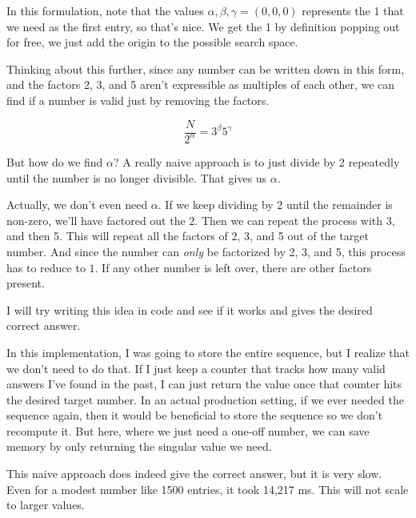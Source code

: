 \documentclass{article}
\begin{document}
In this formulation, note that the values $\alpha, \beta, \gamma = (0,0,0)$ represents the 1 that we need as the first entry, so that's nice. We get the 1 by definition popping out for free, we just add the origin to the possible search space. \newline

Thinking about this further, since any number can be written down in this form, and the factors 2, 3, and 5 aren't expressible as multiples of each other, we can find if a number is valid just by removing the factors.

\begin{equation}
    \frac{N}{2^{\alpha}} = 3^{\beta} 5^{\gamma}
\end{equation}

But how do we find $\alpha$? A really naive approach is to just divide by 2 repeatedly until the number is no longer divisible. That gives us $\alpha$. \newline

Actually, we don't even need $\alpha$. If we keep dividing by 2 until the remainder is non-zero, we'll have factored out the 2. Then we can repeat the process with 3, and then 5. This will repeat all the factors of 2, 3, and 5 out of the target number. And since the number can \textit{only} be factorized by 2, 3, and 5, this process has to reduce to $1$. If any other number is left over, there are other factors present. \newline

I will try writing this idea in code and see if it works and gives the desired correct answer. \newline

In this implementation, I was going to store the entire sequence, but I realize that we don't need to do that. If I just keep a counter that tracks how many valid answers I've found in the past, I can just return the value once that counter hits the desired target number. In an actual production setting, if we ever needed the sequence again, then it would be beneficial to store the sequence so we don't recompute it. But here, where we just need a one-off number, we can save memory by only returning the singular value we need. \newline

This naive approach does indeed give the correct answer, but it is very slow. Even for a modest number like 1500 entries, it took 14,217 ms. This will not scale to larger values. \newline
\end{document}
